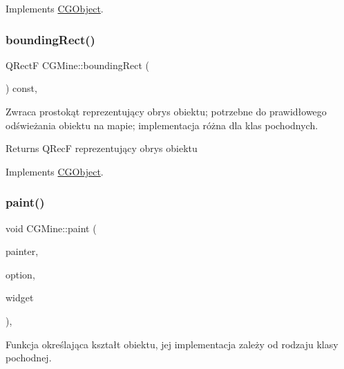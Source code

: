 Implements \mbox{\hyperlink{class_c_g_object_a859e765fbb3ab0d6ad73ca58e5e49779}{C\+G\+Object}}.

\mbox{\label{class_c_g_mine_ad11ed34f5cd02b51fd2baeaf700daba2}} 
\subsubsection{\texorpdfstring{bounding\+Rect()}{boundingRect()}}
{\footnotesize\ttfamily Q\+RectF C\+G\+Mine\+::bounding\+Rect (\begin{DoxyParamCaption}{ }\end{DoxyParamCaption}) const\hspace{0.3cm}{\ttfamily [override]}, {\ttfamily [virtual]}}



Zwraca prostokąt reprezentujący obrys obiektu; potrzebne do prawidłowego odświeżania obiektu na mapie; implementacja różna dla klas pochodnych. 

\begin{DoxyReturn}{Returns}
Q\+RecF reprezentujący obrys obiektu 
\end{DoxyReturn}


Implements \mbox{\hyperlink{class_c_g_object_ab9edf3d10a53c254cdb5d3d8de930207}{C\+G\+Object}}.

\mbox{\label{class_c_g_mine_a2a48415eeb9f9e662a068abd09f30b00}} 
\subsubsection{\texorpdfstring{paint()}{paint()}}
{\footnotesize\ttfamily void C\+G\+Mine\+::paint (\begin{DoxyParamCaption}\item[{Q\+Painter $\ast$}]{painter,  }\item[{const Q\+Style\+Option\+Graphics\+Item $\ast$}]{option,  }\item[{Q\+Widget $\ast$}]{widget }\end{DoxyParamCaption})\hspace{0.3cm}{\ttfamily [override]}, {\ttfamily [virtual]}}



Funkcja określająca kształt obiektu, jej implementacja zależy od rodzaju klasy pochodnej. 


